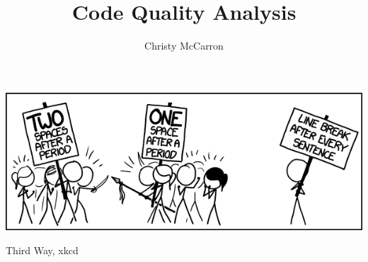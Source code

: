 \documentclass[sigconf, nonacm]{acmart}
\begin{document}
\title{Code Quality Analysis}


\author{Christy McCarron}


\begin{abstract}

\end{abstract}


\begin{teaserfigure}
  \includegraphics[width=\textwidth]{images/third_way.png}
  \caption{Third Way, xkcd}
  \label{fig:thirdWay}
\end{teaserfigure}

\maketitle











\end{document}
